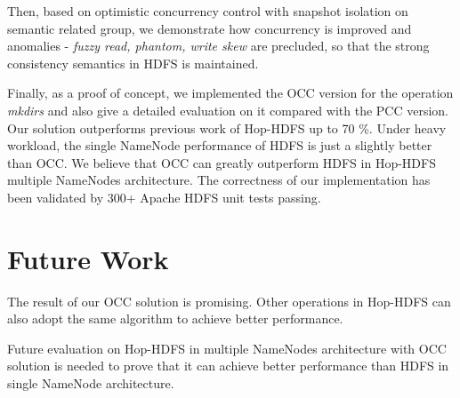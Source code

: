 \noindent Then, based on optimistic concurrency control with snapshot isolation on semantic related group, we demonstrate how concurrency is improved and anomalies - \textit{fuzzy read, phantom, write skew} are precluded, so that the strong consistency semantics in HDFS is maintained.

\noindent Finally, as a proof of concept, we implemented the OCC version for the operation \textit{mkdirs} and also give a detailed evaluation on it compared with the PCC version. Our solution outperforms previous work of Hop-HDFS up to 70 \%. Under heavy workload, the single NameNode performance of HDFS is just a slightly better than OCC. We believe that OCC can greatly outperform HDFS in Hop-HDFS multiple NameNodes architecture. The correctness of our implementation has been validated by 300+ Apache HDFS unit tests passing.


\section{Future Work}

The result of our OCC solution is promising. Other operations in Hop-HDFS can also adopt the same algorithm to achieve better performance.

\noindent Future evaluation on Hop-HDFS in multiple NameNodes architecture with OCC solution is needed to prove that it can achieve better performance than HDFS in single NameNode architecture.

